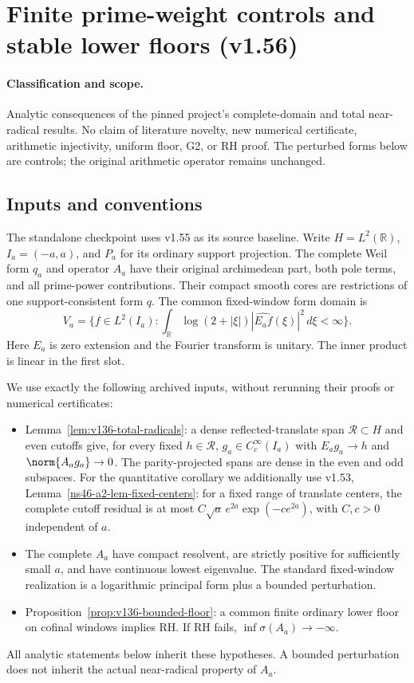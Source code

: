 \section{Finite prime-weight controls and stable lower floors (v1.56)}
\label{sec:v156-prime-weight-controls}

\paragraph{Classification and scope.} Analytic consequences of the pinned project's complete-domain
and total near-radical results. No claim of literature novelty, new numerical
certificate, arithmetic injectivity, uniform floor, G2, or RH proof.
The perturbed forms below are controls; the original arithmetic operator remains unchanged.

\subsection*{Inputs and conventions}
The standalone checkpoint uses v1.55 as its source baseline.
Write $H=L^2(\mathbb R)$, $I_a=(-a,a)$, and $P_a$ for its ordinary support projection.
The complete Weil form $q_a$ and operator $A_a$ have their original
archimedean part, both pole terms, and all prime-power contributions.
Their compact smooth cores are restrictions of one support-consistent form $q$.
The common fixed-window form domain is
\[
 V_a=\{f\in L^2(I_a):\int_\mathbb R\log(2+|\xi|)
           |\widehat{E_af}(\xi)|^2\,d\xi<\infty\}.
\]
Here $E_a$ is zero extension and the Fourier transform is unitary.
The inner product is linear in the first slot.

We use exactly the following archived inputs, without rerunning their proofs
or numerical certificates:
\begin{itemize}
\item Lemma~\ref{lem:v136-total-radicals}: a dense reflected-translate
span $\mathcal R\subset H$ and even cutoffs give, for every fixed
$h\in\mathcal R$, $g_a\in C_c^\infty(I_a)$ with
$E_ag_a\to h$ and $\norm{A_ag_a}\to0$.
The parity-projected spans are dense in the even and odd subspaces.
For the quantitative corollary we additionally use v1.53,
Lemma~\ref{ns46-a2-lem-fixed-centers}: for a fixed range of translate
centers, the complete cutoff residual is at most
$C\sqrt a\,e^{2a}\exp(-c e^{2a})$, with $C,c>0$ independent of $a$.
\item The complete $A_a$ have compact resolvent, are strictly positive
for sufficiently small $a$, and have continuous lowest eigenvalue.
The standard fixed-window realization is a logarithmic principal form
plus a bounded perturbation.
\item Proposition~\ref{prop:v136-bounded-floor}: a common finite
ordinary lower floor on cofinal windows implies RH. If RH fails,
$\inf\sigma(A_a)\to-\infty$.
\end{itemize}
All analytic statements below inherit these hypotheses. A bounded perturbation
does not inherit the actual near-radical property of $A_a$.


